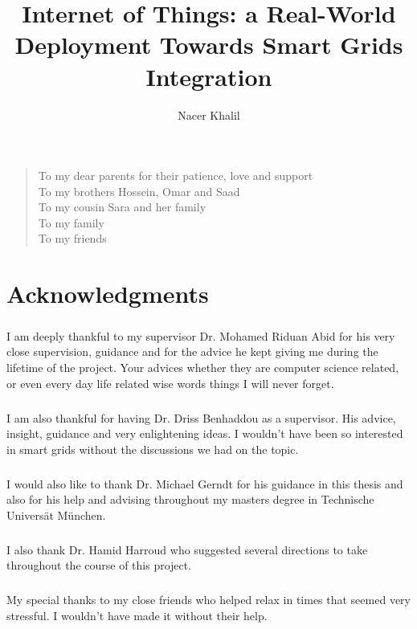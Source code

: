 \documentclass[oneside,12pt,a4paper,final]{book}
\author{Nacer Khalil}
\title{Internet of Things: a Real-World Deployment Towards Smart Grids Integration}
\newenvironment{dedication}{\vspace{6ex}\begin{quotation}\begin{center}\begin{em}}{\par\end{em}\end{center}\end{quotation}}
\begin{document}
\doublespacing

\frontmatter


\chapter{} %
\begin{dedication}
To my dear parents for their patience, love and support \\
To my brothers Hossein, Omar and Saad \\
To my cousin Sara and her family \\
To my family \\
To my friends \\

\end{dedication}
\chapter{Acknowledgments}
\paragraph{}
I am deeply thankful to my supervisor Dr. Mohamed Riduan Abid for his very close supervision, guidance and for the advice he kept giving me during the lifetime of the project. Your advices whether they are computer science related, or even every day life related wise words things I will never forget.
\paragraph*{}
I am also thankful for having Dr. Driss Benhaddou as a supervisor. His advice, insight, guidance and very enlightening ideas. I wouldn't have been so interested in smart grids without the discussions we had on the topic.
\paragraph{}
I would also like to thank Dr. Michael Gerndt for his guidance in this thesis and also for his help and advising throughout my masters degree in Technische Universät München.
\paragraph{}
I  also thank Dr. Hamid Harroud who suggested several directions to take throughout the course of this project.
\paragraph{}
My special thanks to my close friends who helped relax in times that seemed very stressful. I wouldn't have made it without their help.
\end{document}
